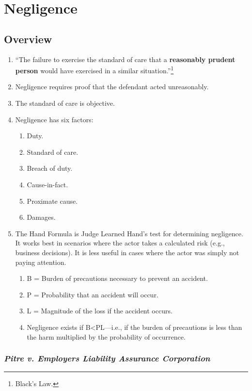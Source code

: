 \section{Negligence}

\subsection{Overview}

\begin{enumerate}
    \item ``The failure to exercise the standard of care that a \textbf{reasonably prudent person} would have exercised in a similar situation.''\footnote{Black's Law.}
    \item Negligence requires proof that the defendant acted unreasonably.
    \item The standard of care is objective.
    \item Negligence has six factors:
    \begin{enumerate}
        \item Duty.
        \item Standard of care.
        \item Breach of duty.
        \item Cause-in-fact.
        \item Proximate cause.
        \item Damages.
    \end{enumerate}
    \item The Hand Formula is Judge Learned Hand's test for determining negligence. It works best in scenarios where the actor takes a calculated risk (e.g., business decisions). It is less useful in cases where the actor was simply not paying attention.
    \begin{enumerate}
        \item B = Burden of precautions necessary to prevent an accident.
        \item P = Probability that an accident will occur.
        \item L = Magnitude of the loss if the accident occurs.
        \item Negligence exists if B\textless PL---i.e., if the burden of precautions is less than the harm multiplied by the probability of occurrence.
    \end{enumerate}
\end{enumerate}

\subsubsection{\emph{Pitre v. Employers Liability Assurance Corporation}}

